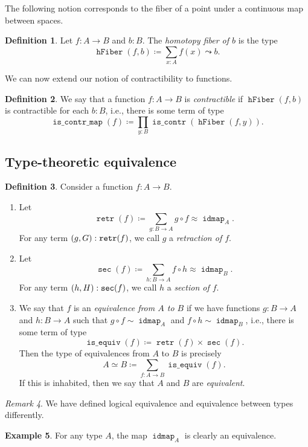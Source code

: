 \documentclass[10pt,letterpaper,cm]{nupset}
\theoremstyle{definition}
\newtheorem{definition}{Definition}[subsection]
\newtheorem{exmp}[definition]{Example}
\theoremstyle{theorem}
\theoremstyle{remark}
\newtheorem{remark}[definition]{Remark}
\newcommand{\0}{\mathbf{0}}
\newcommand{\1}{\mathbf{1}}
\newcommand{\2}{\mathbf{2}}
\DeclareMathOperator{\retr}{\mathtt{retr}}
\DeclareMathOperator{\sect}{\mathtt{sec}}
\DeclareMathOperator{\idmap}{\mathtt{idmap}}
\DeclareMathOperator{\isequiv}{\mathtt{is\_equiv}}
\DeclareMathOperator{\hfiber}{\mathtt{hFiber}}
\DeclareMathOperator{\iscont}{\mathtt{is\_contr}}
\DeclareMathOperator{\iscontmap}{\mathtt{is\_contr\_map}}
\newcommand{\be}{\begin{enumerate}}
\newcommand{\ee}{\end{enumerate}}
\begin{document}
The following notion corresponds to the fiber of a point under a continuous map between spaces.

\begin{definition} Let $f: A \to B$ and $b: B$.
 The \textit{homotopy fiber of $b$} is the type $$\hfiber(f,b) \coloneqq \sum_{x:A} f(x) \leadsto b .$$
\end{definition}

We can now extend our notion of contractibility to functions. 

\begin{definition}
We say that  a function $f: A \to B$ is \textit{contractible} if $\hfiber(f,b)$ is contractible for each $b: B$, i.e., there is some term of type $$\iscontmap(f) \coloneqq \prod_{y: B} \iscont(\hfiber(f,y)).$$
\end{definition}

\subsection{Type-theoretic equivalence}


\begin{definition} Consider a function $f: A \to B$.
\be
\item Let $$\retr(f) \coloneqq \sum_{g: B \to A} g \circ f \approx \idmap_A    .$$  For any term $\mleft(g, G\mright) : \retr(f)$, we call $g$ a \textit{retraction of $f$}.
\item Let $$\sect(f) \coloneqq \sum_{h: B \to A} f \circ h \approx \idmap_B    .$$ For any term $\mleft(h, H\mright) : \sect(f)$, we call $h$ a \textit{section of $f$}.
\item We say that $f$ is an \textit{equivalence from $A$ to $B$} if we have functions $g : B \to A$ and $h: B\to A$ such that $g \circ f \sim \idmap_A$ and $f \circ h \sim \idmap_B$, i.e., there is some term of type $$ \isequiv(f) \coloneqq \retr(f) \times \sect(f).  $$
Then the type of equivalences from $A$ to $B$ is precisely $$A \simeq B \coloneqq  \sum_{f:A \to B}\isequiv(f).$$ If this is inhabited, then we say that $A$ and $B$ are \textit{equivalent}. 
\ee
\end{definition}

\begin{remark}
We have defined logical equivalence and equivalence between types differently.
\end{remark}

\begin{exmp}\label{idequiv}
For any type $A$, the map $\idmap_A$ is clearly an equivalence.
\end{exmp}
\end{document}
